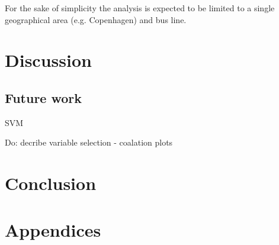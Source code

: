 \documentclass[a4paper,11pt]{article}
\begin{document}
For the sake of simplicity the analysis is expected to be limited to a single geographical area (e.g. Copenhagen) and bus line.


\section{Discussion}

\subsection{Future work}
SVM 

Do: decribe variable selection - coalation plots


\section{Conclusion}

\clearpage
\begin{spacing}{1}
  
  
\end{spacing}

\clearpage
\appendix
\section*{Appendices}
\renewcommand{\thesubsection}{\Alph{subsection}}


\clearpage

\clearpage

\end{document}
